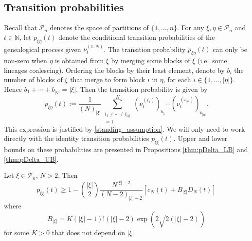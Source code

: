 \subsection{Transition probabilities}
Recall that $\mathcal{P}_n$ denotes the space of partitions of $\{1,\dots,n\}$.
For any $\xi, \eta \in \mathcal{P}_n$ and $t\in\mathbb{N}$, let $p_{\xi\eta}(t)$ denote the conditional transition probabilities of the genealogical process given $\nu_t^{(1:N)}$. %
The transition probability $p_{\xi\eta}(t)$ can only be non-zero when $\eta$ is obtained from $\xi$ by merging some blocks of $\xi$ (i.e.\ some lineages coalescing).
Ordering the blocks by their least element, denote by $b_i$ the number of blocks of $\xi$ that merge to form block $i$ in $\eta$, for each $i \in \{1,\dots, |\eta|\}$. Hence $b_1 + \cdots + b_{|\eta|} = |\xi|$.
Then the transition probability is given by
\begin{equation}\label{eq:defn_pxieta}
p_{\xi\eta}(t) 
:= \frac{1}{(N)_{|\xi|}} \sum_{\substack{i_1 \neq \cdots \neq i_{|\eta|} \\ =1}}^N
        (\nu_t^{(i_1)})_{b_1} \cdots (\nu_t^{(i_{|\eta|})})_{b_{|\eta|}} .
\end{equation}
This expression is justified by \ref{standing_assumption}.
We will only need to work directly with the identity transition probabilities $p_{\xi\xi}(t)$.
Upper and lower bounds on these probabilities are presented in Propositions \ref{thm:pDelta_LB} and \ref{thm:pDelta_UB}.
\begin{prop}%
\label{thm:pDelta_LB}
Let $\xi \in \mathcal{P}_n$, $N>2$. Then
\begin{equation*}
p_{\xi\xi}(t)
\geq 1 - \binom{|\xi|}{2} \frac{N^{|\xi|-2}}{(N-2)_{|\xi|-2}} \left[ c_N(t) + B_{|\xi|} D_N(t) \right]
\end{equation*}
where 
\begin{equation*}
B_{|\xi|} = K (|\xi|-1)! (|\xi|-2) \exp( 2 \sqrt{2(|\xi|-2)} )
\end{equation*}
for some $K>0$ that does not depend on $|\xi|$.
\end{prop}
